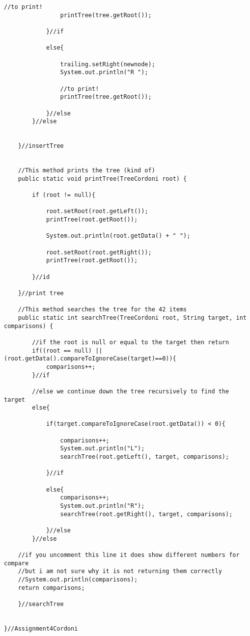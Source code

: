 \documentclass[letterpaper, 10pt,DIV=13]{scrartcl}
\numberwithin{equation}{section} %
\numberwithin{figure}{section} %
\numberwithin{table}{section} %
\begin{document}
\begin{lstlisting}[frame=single, ]
                //to print!
                printTree(tree.getRoot());

            }//if

            else{

                trailing.setRight(newnode);
                System.out.println("R ");
                
                //to print!
                printTree(tree.getRoot());

            }//else
        }//else


    }//insertTree


    //This method prints the tree (kind of)
    public static void printTree(TreeCordoni root) {

        if (root != null){

            root.setRoot(root.getLeft());
            printTree(root.getRoot());

            System.out.println(root.getData() + " ");
            
            root.setRoot(root.getRight());
            printTree(root.getRoot());

        }//id

    }//print tree

    //This method searches the tree for the 42 items
    public static int searchTree(TreeCordoni root, String target, int comparisons) {

        //if the root is null or equal to the target then return
        if((root == null) || (root.getData().compareToIgnoreCase(target)==0)){
            comparisons++;
        }//if

        //else we continue down the tree recursively to find the target
        else{

            if(target.compareToIgnoreCase(root.getData()) < 0){

                comparisons++;
                System.out.println("L");
                searchTree(root.getLeft(), target, comparisons);
                
            }//if

            else{
                comparisons++;
                System.out.println("R");
                searchTree(root.getRight(), target, comparisons);
                
            }//else
        }//else

    //if you uncomment this line it does show different numbers for compare
    //but i am not sure why it is not returning them correctly
    //System.out.println(comparisons);
    return comparisons;

    }//searchTree
    

}//Assignment4Cordoni
\end{lstlisting}
\end{document}
